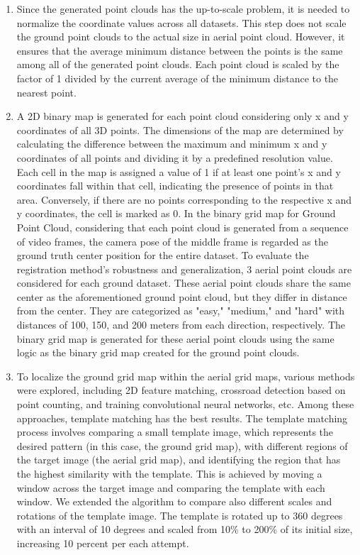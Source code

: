 \documentclass[11pt]{article}
\begin{document}
\begin{enumerate}
        \item Since the generated point clouds has the up-to-scale problem, it is needed to normalize the
        coordinate values across all datasets. This step does not scale the ground point clouds to the actual size
        in aerial point cloud. However, it ensures that the average minimum distance between the points is the same
        among all of the generated point clouds.
        Each point cloud is scaled by the factor of 1 divided by the current average of the minimum distance to the nearest point.

        \item A 2D binary map is generated for each point cloud considering only x and y coordinates of all 3D points.
        The dimensions of the map are determined by calculating the difference between the maximum and minimum x and y
        coordinates of all points and dividing it by a predefined resolution value. Each cell in the map is assigned
        a value of 1 if at least one point's x and y coordinates fall within that cell, indicating the presence of
        points in that area. Conversely, if there are no points corresponding to the respective x and y coordinates,
        the cell is marked as 0. In the binary grid map for Ground Point Cloud, considering that each point cloud is
        generated from a sequence of video frames, the camera pose of the middle frame is regarded as the ground truth
        center position for the entire dataset. To evaluate the registration method's robustness and generalization,
        3 aerial point clouds are considered for each ground dataset. These aerial point clouds share the same center
        as the aforementioned ground point cloud, but they differ in distance from the center. They are categorized
        as "easy," "medium," and "hard" with distances of 100, 150, and 200 meters from each direction, respectively.
        The binary grid map is generated for these aerial point clouds using the same logic as the binary grid map
        created for the ground point clouds.

        \item To localize the ground grid map within the aerial grid maps, various methods were explored, including
        2D feature matching, crossroad detection based on point counting, and training convolutional neural networks,
        etc. Among these approaches, template matching has the best results. The template matching process involves
        comparing a small template image, which represents the desired pattern (in this case, the ground grid map),
        with different regions of the target image (the aerial grid map), and identifying the region that has the highest
        similarity with the template. This is achieved by moving a window across the target
        image and comparing the template with each window. We extended the algorithm to compare also different
        scales and rotations of the template image. The template is rotated up to 360 degrees with an interval of 10 degrees and
        scaled from 10\% to 200\% of its initial size, increasing 10 percent per each attempt.

    \end{enumerate}
\end{document}
